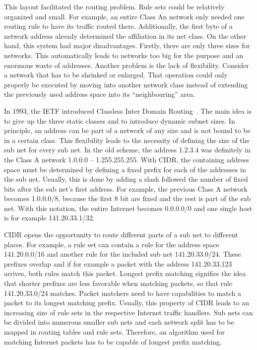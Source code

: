\documentclass[a4paper,
		12pt,
		parskip=full,
		titlepage
		]{scrartcl}
\begin{document}
This layout facilitated the routing problem.
Rule sets could be relatively organized and small.
For example, an entire Class An network only needed one routing rule to have its traffic routed there.
Additionally, the first byte of a network address already determined the affiliation in its net class.
On the other hand, this system had major disadvantages.
Firstly, there are only three sizes for networks.
This automatically leads to networks too big for the purpose and an enormous waste of addresses.
Another problem is the lack of flexibility.
Consider a network that has to be shrinked or enlarged.
That operation could only properly be executed by moving into another network class instead of extending the 
previously used address space into its \enquote{neighbouring} area.

In 1993, the IETF introduced Classless Inter Domain Routing~\cite{rfc1518, rfc4632}.
The main idea is to give up the three static classes and to introduce dynamic subnet sizes.
In principle, an address can be part of a network of any size and is not bound to be in a certain class.
This flexibility leads to the necessity of defining the size of the sub net for every sub net.
In the old scheme, the address 1.2.3.4 was definitely in the Class A network 1.0.0.0 -- 1.255.255.255.
With CIDR, the containing address space must be determined by defining a fixed prefix for each of the addresses in the sub net.
Usually, this is done by adding a slash followed the number of fixed bits after the sub net's first address.
For example, the previous Class A network becomes 1.0.0.0/8, because the first 8 bit are fixed and the rest is part of the sub net.
With this notation, the entire Internet becomes 0.0.0.0/0 and one single host is for example 141.20.33.1/32.

CIDR opens the opportunity to route different parts of a sub net to different places.
For example, a rule set can contain a rule for the address space 141.20.0.0/16 and another rule for the included sub net 141.20.33.0/24.
These prefixes overlap and if for example a packet with the address 141.20.33.123 arrives, both rules match this packet.
Longest prefix matching signifies the idea that shorter prefixes are less favorable when matching packets, so that rule 141.20.33.0/24 matches.
Packet matchers need to have capabilities to match a packet to its longest matching prefix.
Usually, this property of CIDR leads to an increasing size of rule sets in the respective Internet traffic handlers. %
Sub nets can be divided into numerous smaller sub nets and each network split has to be mapped in routing tables and rule sets.
Therefore, an algorithm used for matching Internet packets has to be capable of longest prefix matching.
\end{document}
